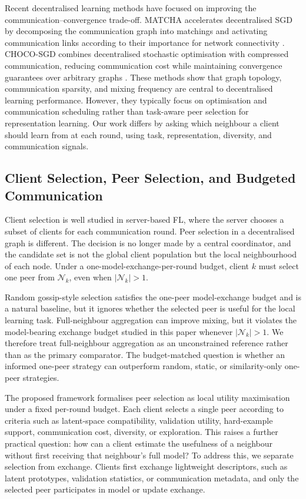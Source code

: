 \documentclass[conference]{IEEEtran}
\begin{document}
Recent decentralised learning methods have focused on improving the communication--convergence trade-off. MATCHA accelerates decentralised SGD by decomposing the communication graph into matchings and activating communication links according to their importance for network connectivity \cite{wang2019matcha}. CHOCO-SGD combines decentralised stochastic optimisation with compressed communication, reducing communication cost while maintaining convergence guarantees over arbitrary graphs \cite{koloskova2019choco}. These methods show that graph topology, communication sparsity, and mixing frequency are central to decentralised learning performance. However, they typically focus on optimisation and communication scheduling rather than task-aware peer selection for representation learning. Our work differs by asking which neighbour a client should learn from at each round, using task, representation, diversity, and communication signals.

\subsection{Client Selection, Peer Selection, and Budgeted Communication}
\label{subsec:client-selection-peer-selection-and-communication}
Client selection is well studied in server-based FL, where the server chooses a subset of clients for each communication round. Peer selection in a decentralised graph is different. The decision is no longer made by a central coordinator, and the candidate set is not the global client population but the local neighbourhood of each node. Under a one-model-exchange-per-round budget, client $k$ must select one peer from $\mathcal{N}_k$, even when $|\mathcal{N}_k|>1$.

Random gossip-style selection satisfies the one-peer model-exchange budget and is a natural baseline, but it ignores whether the selected peer is useful for the local learning task. Full-neighbour aggregation can improve mixing, but it violates the model-bearing exchange budget studied in this paper whenever $|\mathcal{N}_k|>1$. We therefore treat full-neighbour aggregation as an unconstrained reference rather than as the primary comparator. The budget-matched question is whether an informed one-peer strategy can outperform random, static, or similarity-only one-peer strategies.

The proposed framework formalises peer selection as local utility maximisation under a fixed per-round budget. Each client selects a single peer according to criteria such as latent-space compatibility, validation utility, hard-example support, communication cost, diversity, or exploration. This raises a further practical question: how can a client estimate the usefulness of a neighbour without first receiving that neighbour's full model? To address this, we separate selection from exchange. Clients first exchange lightweight descriptors, such as latent prototypes, validation statistics, or communication metadata, and only the selected peer participates in model or update exchange.
\end{document}
